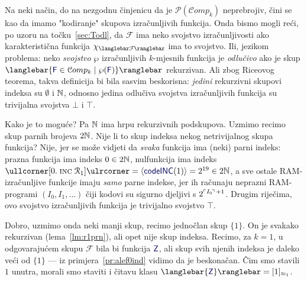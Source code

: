 Na neki način, do na nezgodnu činjenicu da je $\mathcal P(\mathcal Comp_k)$ neprebrojiv, čini se kao da imamo "kodiranje" skupova izračunljivih funkcija. Onda bismo mogli reći, po uzoru na točku~\ref{sec:Todl}, da $\mathcal F$ ima neko svojstvo izračunljivosti ako karakteristična funkcija $\chi_{\knk{\mathcal F}}$ ima to svojstvo. Ili, jezikom problema: neko \emph{svojstvo} $\wp$ izračunljivih $k$-mjesnih funkcija je \emph{odlučivo} ako je skup $\knk{\{\f F\in\mathcal Comp_k\mid\wp(\f F)\}}$ rekurzivan. Ali zbog Riceovog teorema, takva definicija bi bila sasvim beskorisna: \emph{jedini} rekurzivni skupovi indeksa su $\emptyset$ i ${\mathbb N}$, odnosno jedina odlučiva svojstva izračunljivih funkcija su trivijalna svojstva $\bot$ i $\top$.


Kako je to moguće? Pa ${\mathbb N}$ ima hrpu rekurzivnih podskupova. Uzmimo recimo skup parnih brojeva $2{\mathbb N}$. Nije li to skup indeksa nekog netrivijalnog skupa funkcija? Nije, jer se može vidjeti da \emph{svaka} funkcija ima (neki) parni indeks: prazna funkcija ima indeks $0\in2{\mathbb N}$, nulfunkcija ima indeks $\kprog{[0.\;\incr1]}=\kr{\f{codeINC}(1)}=2^{19}\in2\N$, a sve ostale RAM-izračunljive funkcije imaju \emph{samo} parne indekse, jer ih računaju neprazni RAM-programi $(I_0,I_1,\dotsc)$ čiji kodovi su sigurno djeljivi s $2^{\ulcorner I_0\!\urcorner\,+1}$. Drugim riječima, ovo svojstvo izračunljivih funkcija je trivijalno svojstvo $\top$.

Dobro, uzmimo onda neki manji skup, recimo jednočlan skup $\{1\}$. On je svakako rekurzivan (lema~\ref{lm:r1prn}), ali opet nije skup indeksa. Recimo, za $k=1$, u odgovarajućem skupu $\mathcal F$ bila bi funkcija $\f Z$, ali skup svih njenih indeksa je daleko veći od $\{1\}$ --- iz primjera~\ref{pr:alef0ind} vidimo da je beskonačan. Čim smo stavili $1$ unutra, morali smo staviti i čitavu klasu $\knk{\{\f Z\}}=[1]_{\approx_1}$.

